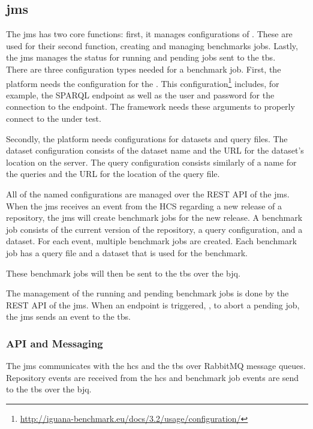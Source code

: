 \subsection{\acl{jms}}
\label{sec:jobs_managing_service}
The \acf{jms} has two core functions: first, it manages configurations of \tsp{}.
These are used for their second function, creating and managing benchmarks jobs.
Lastly, the \ac{jms} manages the status for running and pending jobs sent to the \ac{tbs}.
\\

There are three configuration types needed for a benchmark job.
First, the platform needs the configuration for the \ts{}.
This configuration\footnote{\url{http://iguana-benchmark.eu/docs/3.2/usage/configuration/}} includes, for example, the SPARQL endpoint as well as the user and password for the connection to the endpoint.
The \iguana{} framework needs these arguments to properly connect to the \ts{} under test.

Secondly, the platform needs configurations for datasets and query files.
The dataset configuration consists of the dataset name and the URL for the dataset's location on the server.
The query configuration consists similarly of a name for the queries and the URL for the location of the query file.

All of the named configurations are managed over the REST API of the \ac{jms}.
\\

When the \ac{jms} receives an event from the HCS regarding a new release of a repository, the \ac{jms} will create benchmark jobs for the new release.
A benchmark job consists of the current version of the repository, a query configuration, and a dataset.
For each event, multiple benchmark jobs are created.
Each benchmark job has a query file and a dataset that is used for the benchmark.

These benchmark jobs will then be sent to the \ac{tbs} over the \acl{bjq}.

The management of the running and pending benchmark jobs is done by the REST API of the \ac{jms}.
When an endpoint is triggered, \eg, to abort a pending job, the \ac{jms} sends an event to the \ac{tbs}.


\subsubsection{API and Messaging}
\label{sec:jobs_api}
The \ac{jms} communicates with the \ac{hcs} and the \ac{tbs} over RabbitMQ message queues.
Repository events are received from the \ac{hcs} and benchmark job events are send to the \ac{tbs} over the \ac{bjq}.
\\


